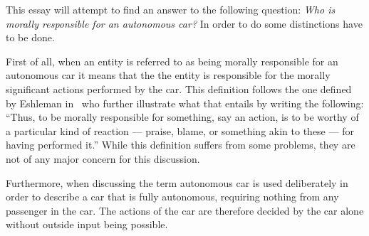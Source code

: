 This essay will attempt to find an answer to the following question:
\textit{Who is morally responsible for an autonomous car?}
In order to do some distinctions have to be done.

First of all, when an entity is referred to as being morally responsible for an
autonomous car it means that the the entity is responsible for the morally
significant actions performed by the car. This definition follows the one
defined by Eshleman in~\cite{esheleman_2014_moral_mra} who further illustrate
what that entails by writing the following:
``Thus, to be morally responsible for something, say an action, is to be
worthy of a particular kind of reaction --- praise, blame, or something akin to
these --- for having performed it.''
While this definition suffers from some problems, they are not of any major
concern for this discussion.

Furthermore, when discussing the term autonomous car is used deliberately in
order to describe a car that is fully autonomous, requiring nothing from any
passenger in the car. The actions of the car are therefore decided by the car
alone without outside input being possible.
